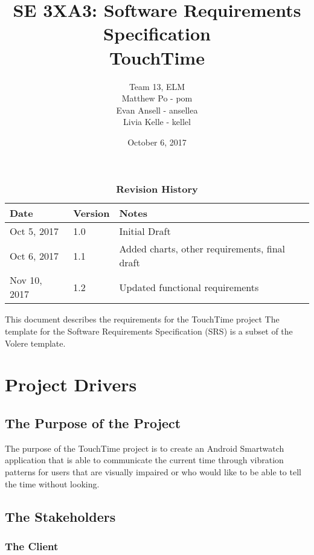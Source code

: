 \documentclass[12pt, titlepage]{article}
\title{SE 3XA3: Software Requirements Specification\\TouchTime}
\author{Team 13, ELM
		\\ Matthew Po - pom
		\\ Evan Ansell - ansellea
		\\ Livia Kelle - kellel
}
\date{October 6, 2017}
\begin{document}
\maketitle

\tableofcontents
\listoftables
\listoffigures

\begin{table}[bp]
\caption{\bf Revision History}
\begin{tabularx}{\textwidth}{p{3cm}p{2cm}X}
\toprule {\bf Date} & {\bf Version} & {\bf Notes}\\
\midrule
Oct 5, 2017 & 1.0 & Initial Draft\\
Oct 6, 2017 & 1.1 & Added charts, other requirements, final draft\\
Nov 10, 2017 & 1.2 & Updated functional requirements\\
\bottomrule
\end{tabularx}
\end{table}

\newpage


This document describes the requirements for the TouchTime project The template for the Software
Requirements Specification (SRS) is a subset of the Volere
template.  

\section{Project Drivers}

\subsection{The Purpose of the Project}
The purpose of the TouchTime project is to create an Android Smartwatch application that is able to communicate the current time through vibration patterns for users that are visually impaired or who would like to be able to tell the time without looking.

\subsection{The Stakeholders}

\subsubsection{The Client}
\end{document}
